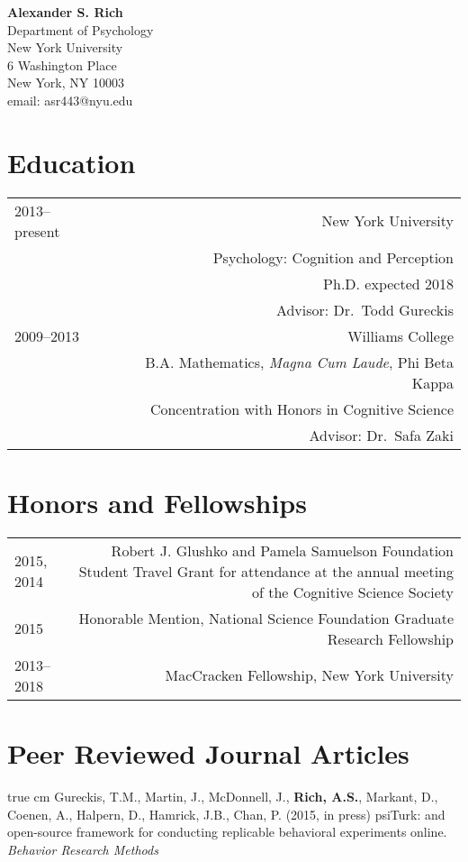\documentclass[12pt]{my_cv}
\def\ind{\hangindent=1 true cm\hangafter=1 \noindent}
\begin{document}
\noindent \textbf{\sffamily\Large Alexander S. Rich}\vspace{1em}\\
Department of Psychology\\
New York University\\
6 Washington Place\\
 New York, NY 10003\\
email: asr443@nyu.edu\\

\section{Education}
\begin{tabular}{L R}
2013--present&New York University\\
&Psychology: Cognition and Perception\\
&Ph.D. expected 2018\\
&Advisor: Dr.\ Todd Gureckis \vspace{1em}\\ 
2009--2013&Williams College\\
&B.A. Mathematics, \emph{Magna Cum Laude}, Phi Beta Kappa\\
&Concentration with Honors in Cognitive Science\\
&Advisor: Dr.\ Safa Zaki\\
\end{tabular}

\section{Honors and Fellowships}
\begin{tabular}{L R}
2015, 2014&Robert J. Glushko and Pamela Samuelson Foundation Student Travel Grant for attendance at the annual meeting of the Cognitive Science Society\\[1ex]
2015&Honorable Mention, National Science Foundation Graduate Research Fellowship\\[1ex]
2013--2018&MacCracken Fellowship, New York University\\
\end{tabular}

\section{Peer Reviewed Journal Articles}

\ind Gureckis, T.M., Martin, J., McDonnell, J., \textbf{Rich, A.S.}, Markant,
D., Coenen, A., Halpern, D., Hamrick, J.B., Chan, P. (2015, in press) psiTurk: and
open-source framework for conducting replicable behavioral experiments online.
\emph{Behavior Research Methods}
\end{document}
